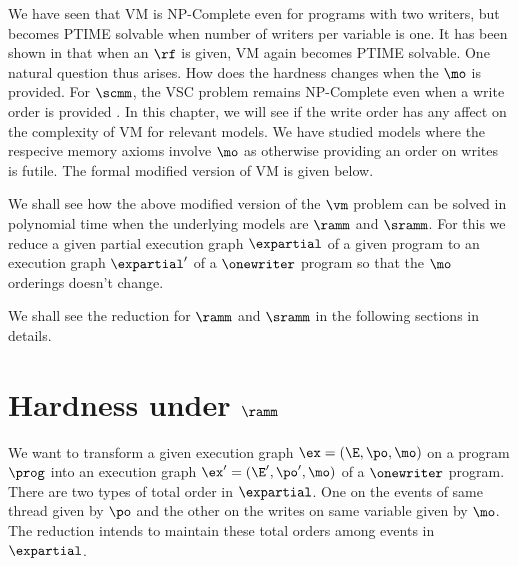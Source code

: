 We have seen that VM is NP-Complete even for programs with two writers, but becomes PTIME solvable when  number of writers per variable is one. It has been shown in \cite{Tunc2023} that when an $\rf$ is given, VM again becomes PTIME solvable. One natural question thus arises. How does the hardness changes when the $\mo$ is provided. For $\scmm$, the VSC problem remains NP-Complete even when a write order is provided \cite{gibbons}. In this chapter, we will see if the write order has any affect on the complexity of VM for relevant models. We have studied models where the respecive memory axioms involve $\mo$ as otherwise providing an order on writes is futile. The formal modified version of VM is given below.   


\begin{center}
\end{center}

We shall see how the above modified version of the $\vm$ problem can be solved in polynomial time when the underlying models are $\ramm$ and $\sramm$. For this we reduce a given partial execution graph $\expartial$ of a given program to an execution graph $\expartial'$  of a $\onewriter$ program so that the $\mo$ orderings doesn't change.

We shall see the reduction for $\ramm$ and $\sramm$  in the following sections in details. 


\section{Hardness under $\ramm$}

We want to transform a given execution graph $\ex=(\E, \po, \mo)$ on a program $\prog$ into an execution graph $\ex'= (\E', \po', \mo)$ of a $\onewriter$ program. There are two types of total order in $\expartial$. One on the events of same thread  given by $\po$ and the other on the writes on same variable given by $\mo$. The reduction intends to maintain these   total orders among events in $\expartial$. 

